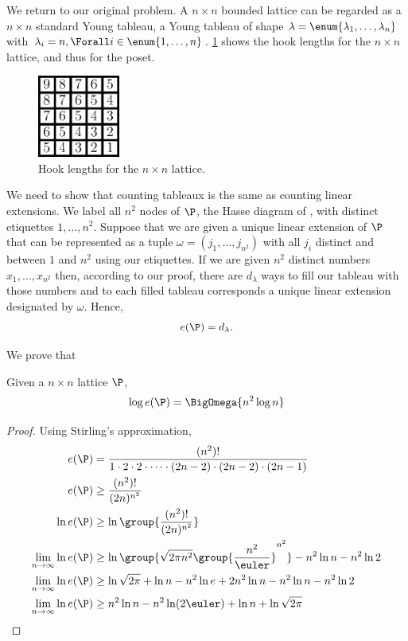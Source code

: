 We return to our original problem. A \( n \times n \) bounded lattice can be regarded as a \( n \times n \)
standard Young tableau, \ie a Young tableau of shape
\( \lambda = \enum{ \lambda_1 , \ldots , \lambda_n } \)
with
\( \lambda_i = n, \Forall i \in \enum{1, \ldots, n}\).
\ref{fig:xy:lattice:xyhooks} shows the hook lengths
for the \( n \times n \) lattice, and thus for the \XY poset.
\begin{figure}
\centering
\includegraphics[width=0.24\textwidth]{fig/x+y/lattice/xyhooks}
\caption{Hook lengths for the \( n \times n \) lattice.}
\label{fig:xy:lattice:xyhooks}
\end{figure}
We need to show that counting tableaux is the same as counting linear
extensions. We label all \( n^2 \) nodes of \(\P\), the Hasse diagram of
\XY, with distinct etiquettes \(1,\ldots,n^2\). Suppose that we are
given a unique linear extension of \(\P\) that can be represented as a tuple
\( \omega = ( j_1 , \ldots , j_{n^2}) \)
with all \( j_i \) distinct and between \(1\) and \( n^2 \) using our
etiquettes. If we are given \( n^2 \) distinct numbers \( x_1,\ldots,x_{n^2} \)
then, according to our proof, there are \( d_{\lambda} \) ways to
fill our tableau with those numbers and to each filled tableau corresponds a
unique linear extension designated by \(\omega\). Hence,
\begin{displaymath}
e(\P) = d_{\lambda}.
\end{displaymath}

We prove that
\begin{theorem}
Given a \( n \times n \) lattice \(\P\),
\begin{displaymath}
\log e(\P) = \BigOmega{n^2 \log n}
\end{displaymath}
\end{theorem}
\begin{proof}
Using Stirling's approximation,
\begin{align*}
e(\P) &= \frac{(n^2)!}{1 \cdot 2 \cdot 2 \cdot \cdots \cdot (2n-2) \cdot (2n-2) \cdot (2n-1)}\\
e(\P) &\ge \frac{(n^2)!}{(2n)^{n^2}}\\
\ln e(\P) &\ge \ln \group{\frac{(n^2)!}{(2n)^{n^2}}}\\
\lim_{n \to \infty} \ln e(\P) &\ge \ln{\group{\sqrt{2 \pi n^2}
\group{\frac{n^2}{\euler}}^{n^2}}}  - n^2 \ln n - n^2 \ln 2\\
\lim_{n \to \infty} \ln e(\P) &\ge \ln{\sqrt{2\pi}} + \ln n - n^2 \ln e + 2 n^2
\ln n - n^2 \ln n - n^2 \ln 2\\
\lim_{n \to \infty} \ln e(\P) &\ge n^2 \ln n - n^2 \ln (2\euler) + \ln n + \ln \sqrt{2\pi}\qedhere
\end{align*}
\end{proof}

